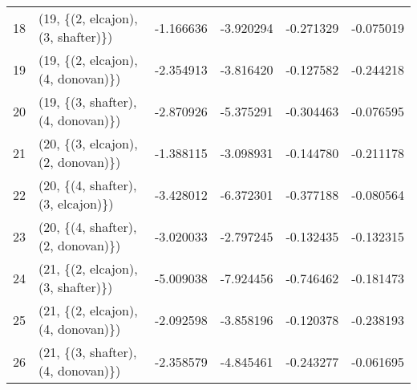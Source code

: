 \begin{tabular}{llrrrr}
18 &  (19, \{(2, elcajon), (3, shafter)\}) &  -1.166636 &  -3.920294 &  -0.271329 & -0.075019 \\
19 &  (19, \{(2, elcajon), (4, donovan)\}) &  -2.354913 &  -3.816420 &  -0.127582 & -0.244218 \\
20 &  (19, \{(3, shafter), (4, donovan)\}) &  -2.870926 &  -5.375291 &  -0.304463 & -0.076595 \\
21 &  (20, \{(3, elcajon), (2, donovan)\}) &  -1.388115 &  -3.098931 &  -0.144780 & -0.211178 \\
22 &  (20, \{(4, shafter), (3, elcajon)\}) &  -3.428012 &  -6.372301 &  -0.377188 & -0.080564 \\
23 &  (20, \{(4, shafter), (2, donovan)\}) &  -3.020033 &  -2.797245 &  -0.132435 & -0.132315 \\
24 &  (21, \{(2, elcajon), (3, shafter)\}) &  -5.009038 &  -7.924456 &  -0.746462 & -0.181473 \\
25 &  (21, \{(2, elcajon), (4, donovan)\}) &  -2.092598 &  -3.858196 &  -0.120378 & -0.238193 \\
26 &  (21, \{(3, shafter), (4, donovan)\}) &  -2.358579 &  -4.845461 &  -0.243277 & -0.061695 \\
\bottomrule
\end{tabular}
